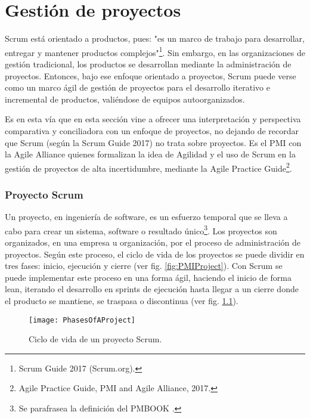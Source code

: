 \chapter{Gestión de proyectos}

Scrum está orientado a productos, pues: "es un marco de trabajo para desarrollar, entregar y mantener productos complejos"\footnote{Scrum Guide 2017 (Scrum.org).}. Sin embargo, en las organizaciones de gestión tradicional, los productos se desarrollan mediante la administración de proyectos. Entonces, bajo ese enfoque orientado a proyectos, Scrum puede verse como un marco ágil de gestión de proyectos para el desarrollo iterativo e incremental de productos, valiéndose de equipos autoorganizados. 

Es en esta vía que en esta sección vine a ofrecer una interpretación y perspectiva comparativa y conciliadora con un enfoque de proyectos, no dejando de recordar que Scrum (según la Scrum Guide 2017) no trata sobre proyectos. Es el PMI con la Agile Alliance quienes formalizan la idea de Agilidad y el uso de Scrum en la gestión de proyectos de alta incertidumbre, mediante la Agile Practice Guide\footnote{Agile Practice Guide, PMI and Agile Alliance, 2017.}.

\subsection{Proyecto Scrum}

Un proyecto, en ingeniería de software, es un esfuerzo temporal que se lleva a cabo para crear un sistema, software o resultado único\footnote{Se parafrasea la definición del PMBOOK \cite{PMBOK-2004}.}. Los proyectos son organizados, en una empresa u organización, por el proceso de administración de proyectos. Según este proceso, el ciclo de vida de los proyectos se puede dividir en tres fases: inicio, ejecución y cierre (ver fig. \ref{fig:PMIProject}). Con Scrum se puede implementar este proceso en una forma ágil, haciendo 
el inicio de forma lean, iterando el desarrollo en sprints de ejecución hasta llegar a un cierre donde el producto se mantiene, se traspasa o discontinua (ver fig. \ref{fig:PhasesOfAProject}). 

\begin{figure}[h]
  \centering
  \texttt{[image: PhasesOfAProject]}
  \caption{Ciclo de vida de un proyecto Scrum.}
  \centering
  \label{fig:PhasesOfAProject} %
\end{figure}
\FloatBarrier %


